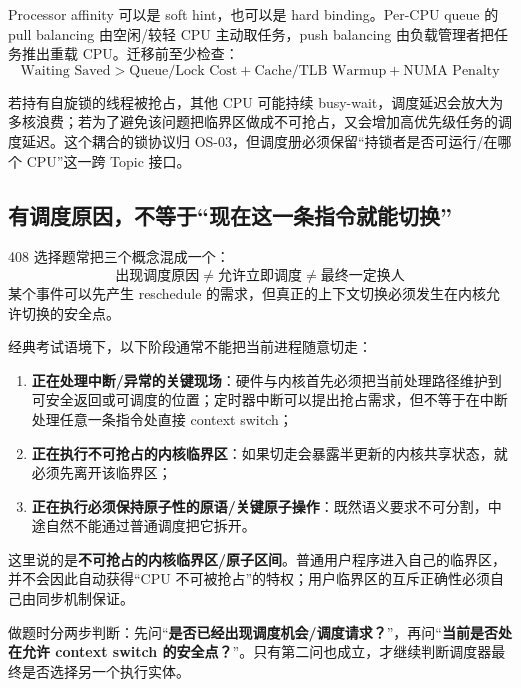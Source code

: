 \documentclass[11pt,a4paper]{ctexart}
\newcommand{\kw}[1]{\textbf{#1}}
\begin{document}
Processor affinity 可以是 soft hint，也可以是 hard binding。Per-CPU queue 的 pull balancing 由空闲/较轻 CPU 主动取任务，push balancing 由负载管理者把任务推出重载 CPU。迁移前至少检查：
\[
\boxed{\text{Waiting Saved}>\text{Queue/Lock Cost}+\text{Cache/TLB Warmup}+\text{NUMA Penalty}}
\]

\begin{warn}[调度与锁不能分开做性能判断]
若持有自旋锁的线程被抢占，其他 CPU 可能持续 busy-wait，调度延迟会放大为多核浪费；若为了避免该问题把临界区做成不可抢占，又会增加高优先级任务的调度延迟。这个耦合的锁协议归 OS-03，但调度册必须保留“持锁者是否可运行/在哪个 CPU”这一跨 Topic 接口。
\end{warn}

\subsection{有调度原因，不等于“现在这一条指令就能切换”}

408 选择题常把三个概念混成一个：
\[
\boxed{\text{出现调度原因}\neq\text{允许立即调度}\neq\text{最终一定换人}}
\]
某个事件可以先产生 reschedule 的需求，但真正的上下文切换必须发生在内核允许切换的安全点。

经典考试语境下，以下阶段通常不能把当前进程随意切走：
\begin{enumerate}
\item \kw{正在处理中断/异常的关键现场}：硬件与内核首先必须把当前处理路径维护到可安全返回或可调度的位置；定时器中断可以提出抢占需求，但不等于在中断处理任意一条指令处直接 context switch；
\item \kw{正在执行不可抢占的内核临界区}：如果切走会暴露半更新的内核共享状态，就必须先离开该临界区；
\item \kw{正在执行必须保持原子性的原语/关键原子操作}：既然语义要求不可分割，中途自然不能通过普通调度把它拆开。
\end{enumerate}

\begin{warn}
这里说的是\kw{不可抢占的内核临界区/原子区间}。普通用户程序进入自己的临界区，并不会因此自动获得“CPU 不可被抢占”的特权；用户临界区的互斥正确性必须自己由同步机制保证。
\end{warn}

\begin{corebox}[调度安全点模型]
做题时分两步判断：先问“\kw{是否已经出现调度机会/调度请求？}”，再问“\kw{当前是否处在允许 context switch 的安全点？}”。只有第二问也成立，才继续判断调度器最终是否选择另一个执行实体。
\end{corebox}
\end{document}
